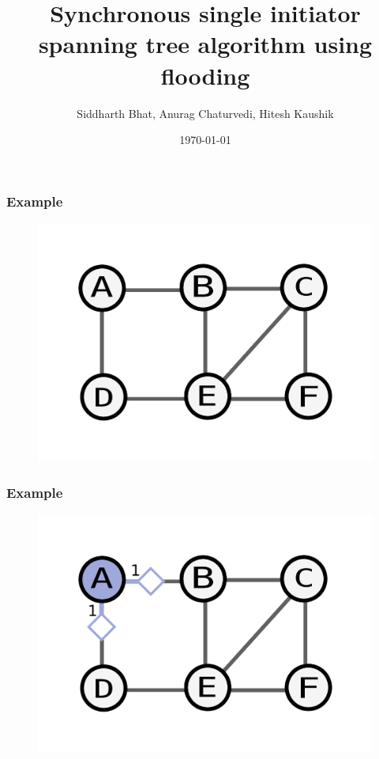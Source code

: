 \documentclass{beamer}
\title{Synchronous single initiator spanning tree algorithm using flooding}
\author{Siddharth Bhat, Anurag Chaturvedi, Hitesh Kaushik}
\date{\today}
\begin{document}
\begin{frame}
\titlepage
\end{frame}

\begin{frame}
\end{frame}


\begin{frame}
    \frametitle{Example}
    \begin{figure}
    \includegraphics[width=0.5\paperwidth]{base.pdf}
    \end{figure}
\end{frame}

\begin{frame}
    \frametitle{Example}
    \begin{figure}
    \includegraphics[width=0.5\paperwidth]{round1.pdf}
    \end{figure}
\end{frame}
\end{document}
